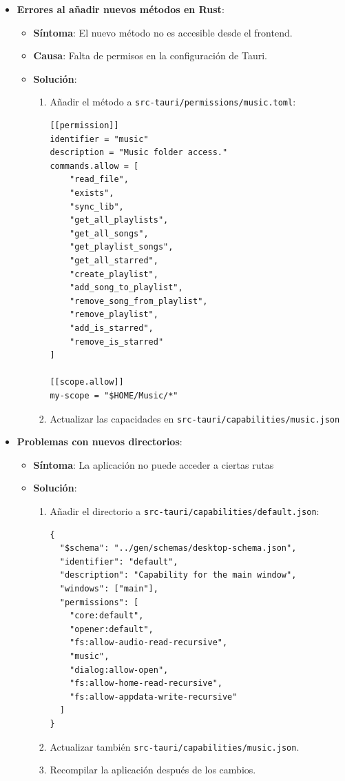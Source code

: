 \documentclass[11pt, a4paper]{article}
\begin{document}
    \begin{itemize}
        \item \textbf{Errores al añadir nuevos métodos en Rust}:
        \begin{itemize}
          \item \textbf{Síntoma}: El nuevo método no es accesible desde el frontend.
          \item \textbf{Causa}: Falta de permisos en la configuración de Tauri.
          \item \textbf{Solución}:
            \begin{enumerate}
              \item Añadir el método a \texttt{src-tauri/permissions/music.toml}:
                \begin{lstlisting}[caption={Solución permisos 1}]
[[permission]]
identifier = "music"
description = "Music folder access."
commands.allow = [
    "read_file",
    "exists",
    "sync_lib",
    "get_all_playlists",
    "get_all_songs",
    "get_playlist_songs",
    "get_all_starred",
    "create_playlist",
    "add_song_to_playlist",
    "remove_song_from_playlist",
    "remove_playlist",
    "add_is_starred",
    "remove_is_starred"
]

[[scope.allow]]
my-scope = "$HOME/Music/*"
                \end{lstlisting}
              \item Actualizar las capacidades en \texttt{src-tauri/capabilities/music.json}
            \end{enumerate}
        \end{itemize}
        
        \item \textbf{Problemas con nuevos directorios}:
        \begin{itemize}
          \item \textbf{Síntoma}: La aplicación no puede acceder a ciertas rutas
          \item \textbf{Solución}:
            \begin{enumerate}
              \item Añadir el directorio a \texttt{src-tauri/capabilities/default.json}:
                \begin{lstlisting}[caption={Solución permisos 2}]
{
  "$schema": "../gen/schemas/desktop-schema.json",
  "identifier": "default",
  "description": "Capability for the main window",
  "windows": ["main"],
  "permissions": [
    "core:default",
    "opener:default",
    "fs:allow-audio-read-recursive",
    "music",
    "dialog:allow-open",
    "fs:allow-home-read-recursive",
    "fs:allow-appdata-write-recursive"
  ]
}
                \end{lstlisting}
              \item Actualizar también \texttt{src-tauri/capabilities/music.json}.
              \item Recompilar la aplicación después de los cambios.
            \end{enumerate}
        \end{itemize}
        

\end{itemize}
\end{document}
